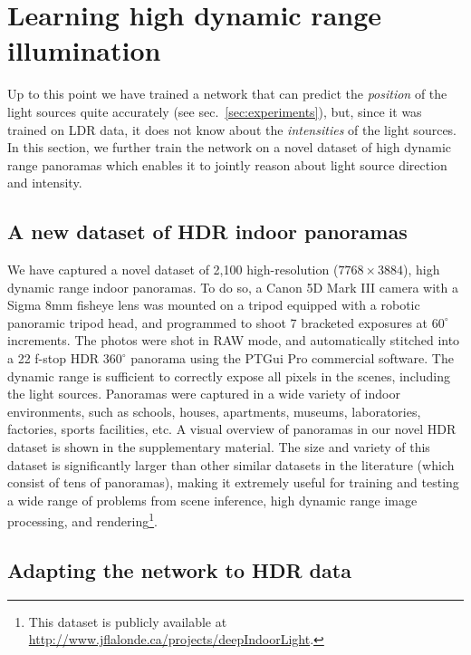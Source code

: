 \section{Learning high dynamic range illumination}
\label{sec:hdr}

Up to this point we have trained a network that can predict the \emph{position} of the light sources quite accurately (see sec.~\ref{sec:experiments}), but, since it was trained on LDR data, it does not know about the \emph{intensities} of the light sources. In this section, we further train the network on a novel dataset of high dynamic range panoramas which enables it to jointly reason about light source direction and intensity. 

\subsection{A new dataset of HDR indoor panoramas}

We have captured a novel dataset of 2,100 high-resolution ($7768\times3884$), high dynamic range indoor panoramas. To do so, a Canon 5D Mark III camera with a Sigma 8mm fisheye lens was mounted on a tripod equipped with a robotic panoramic tripod head, and programmed to shoot 7 bracketed exposures at $60^\circ$ increments. The photos were shot in RAW mode, and automatically stitched into a 22 f-stop HDR $360^\circ$ panorama using the PTGui Pro commercial software. The dynamic range is sufficient to correctly expose all pixels in the scenes, including the light sources. Panoramas were captured in a wide variety of indoor environments, such as schools, houses, apartments, museums, laboratories, factories, sports facilities, etc. A visual overview of panoramas in our novel HDR dataset is shown in the supplementary material. The size and variety of this dataset is significantly larger than other similar datasets in the literature (which consist of tens of panoramas), making it extremely useful for training and testing a wide range of problems from scene inference, high dynamic range image processing, and rendering\footnote{This dataset is publicly available at \url{http://www.jflalonde.ca/projects/deepIndoorLight}.}. 

\subsection{Adapting the network to HDR data}

